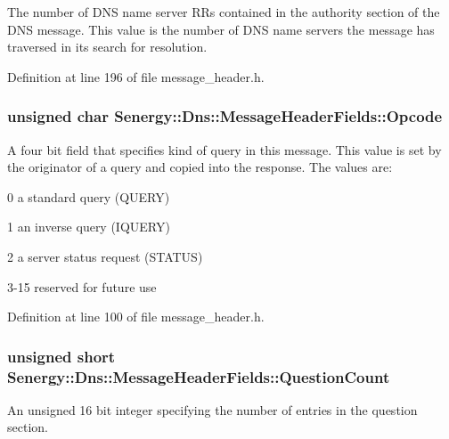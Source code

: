 The number of D\-N\-S name server R\-Rs contained in the authority section of the D\-N\-S message. This value is the number of D\-N\-S name servers the message has traversed in its search for resolution. 



Definition at line 196 of file message\-\_\-header.\-h.

\hypertarget{struct_senergy_1_1_dns_1_1_message_header_fields_ac2d7ba4468405e5693f07d4321058be0}{
\subsubsection[{Opcode}]{\setlength{\rightskip}{0pt plus 5cm}unsigned char Senergy\-::\-Dns\-::\-Message\-Header\-Fields\-::\-Opcode}}\label{struct_senergy_1_1_dns_1_1_message_header_fields_ac2d7ba4468405e5693f07d4321058be0}


A four bit field that specifies kind of query in this message. This value is set by the originator of a query and copied into the response. The values are\-: 

0 a standard query (Q\-U\-E\-R\-Y)

1 an inverse query (I\-Q\-U\-E\-R\-Y)

2 a server status request (S\-T\-A\-T\-U\-S)

3-\/15 reserved for future use 

Definition at line 100 of file message\-\_\-header.\-h.

\hypertarget{struct_senergy_1_1_dns_1_1_message_header_fields_a8af9bbfa134c9e0d4fc846103f7b72ad}{
\subsubsection[{Question\-Count}]{\setlength{\rightskip}{0pt plus 5cm}unsigned short Senergy\-::\-Dns\-::\-Message\-Header\-Fields\-::\-Question\-Count}}\label{struct_senergy_1_1_dns_1_1_message_header_fields_a8af9bbfa134c9e0d4fc846103f7b72ad}


An unsigned 16 bit integer specifying the number of entries in the question section. 



